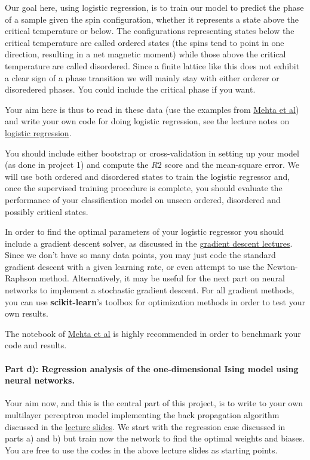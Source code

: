 \documentclass[%
oneside,                 %
final,                   %
10pt]{article}
\begin{document}
Our goal here, using logistic regression, is to train our model to
predict the phase of a sample given the spin configuration, whether it
represents a state above the critical temperature or below.  The
configurations representing states below the critical temperature are
called ordered states (the spins tend to point in one direction,
resulting in a net magnetic moment) while those above the critical
temperature are called disordered. Since a finite lattice like this
does not exhibit a clear sign of a phase transition we will mainly
stay with either orderer or disoredered phases. You could include the
critical phase if you want.


Your aim here is thus to read in these data (use the examples from
\href{{https://physics.bu.edu/~pankajm/ML-Notebooks/HTML/NB_CVII-logreg_ising.html}}{Mehta et
al})
and write your own code for doing logistic regression, see the lecture
notes on \href{{https://compphysics.github.io/MachineLearning/doc/pub/LogReg/html/LogReg-bs.html}}{logistic
regression}.

You should include either bootstrap or cross-validation in setting up
your model (as done in project 1) and compute the $R2$ score and the
mean-square error.
We will use both ordered and disordered states to train
the logistic regressor and, once the supervised training procedure is
complete, you should  evaluate the performance of your classification model on
unseen ordered, disordered and possibly critical states.  



In order to find the optimal parameters of your logistic regressor you should
include a gradient descent solver, as discussed in the \href{{https://compphysics.github.io/MachineLearning/doc/pub/Splines/html/Splines-bs.html}}{gradient
descent
lectures}.
Since we don't have so many data points, you may just code the
standard gradient descent with a given learning rate, or even attempt
to use the Newton-Raphson method.  Alternatively, it may be useful for
the next part on neural networks to implement a stochastic gradient
descent. For all  gradient methods, you can use \textbf{scikit-learn}'s toolbox for
optimization methods in order to test your own results.


The notebook of \href{{https://physics.bu.edu/~pankajm/ML-Notebooks/HTML/NB_CVII-logreg_ising.html}}{Mehta et al} is highly recommended in order to benchmark your code and results.

\paragraph{Part d): Regression analysis of the one-dimensional Ising model using neural networks.}
Your aim now, and this is the central part of this project, is to
write to your own multilayer perceptron model implementing the back
propagation algorithm discussed in the \href{{https://compphysics.github.io/MachineLearning/doc/pub/NeuralNet/html/NeuralNet-bs.html}}{lecture
slides}. We
start with the regression case discussed in parts a) and b) but train
now the network to find the optimal weights and biases. You are free
to use the codes in the above lecture slides as starting points.
\end{document}
